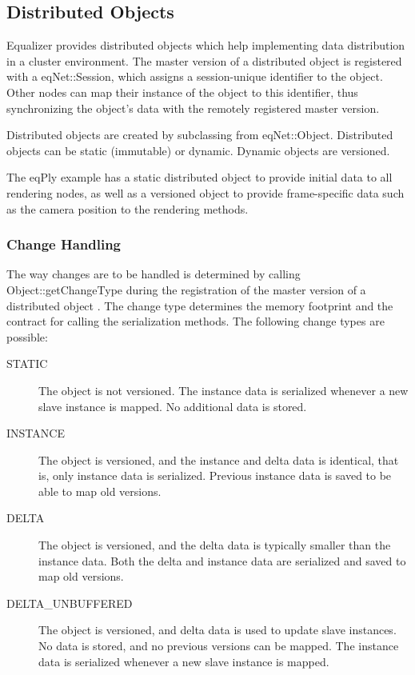 \documentclass[10pt,a4]{scrartcl}
\begin{document}
\subsection{Distributed Objects}

Equalizer provides distributed objects which help implementing data
distribution in a cluster environment. The master version of a distributed
object is registered with a \textsf{eqNet::Session}, which assigns a
session-unique identifier to the object. Other nodes can map their
instance of the object to this identifier, thus synchronizing the
object's data with the remotely registered master version.

Distributed objects are created by subclassing from
\textsf{eqNet::Object}. Distributed objects can be static (immutable) or
dynamic. Dynamic objects are versioned.

The \textsf{eqPly} example has a static distributed object to provide
initial data to all rendering nodes, as well as a versioned object to
provide frame-specific data such as the camera position to the
rendering methods.

\subsubsection{Change Handling}

The way changes are to be handled is determined by calling
\textsf{Object::getChangeType} during the registration of the master
version of a distributed object . The change type determines the memory
footprint and the contract for calling the serialization methods. The
following change types are possible:

\begin{description}
  \item[STATIC] The object is not versioned. The instance data is
    serialized whenever a new slave instance is mapped. No additional
    data is stored.
  \item[INSTANCE] The object is versioned, and the instance and delta
    data is identical, that is, only instance data is
    serialized. Previous instance data is saved to be able to map old
    versions.
  \item[DELTA] The object is versioned, and the delta data is typically
    smaller than the instance data. Both the delta and instance data are
    serialized and saved to map old versions.
  \item[DELTA\_UNBUFFERED] The object is versioned, and delta data is
    used to update slave instances. No data is stored, and no previous
    versions can be mapped. The instance data is serialized whenever a
    new slave instance is mapped.
\end{description}
\end{document}
